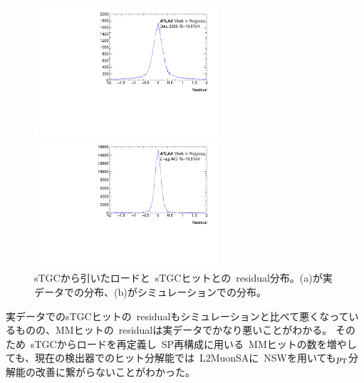 \begin{figure}[H]
        \begin{minipage}[b]{0.48\linewidth}
            \centering
            \includegraphics[clip, width=6.8cm]{fig/5/residualNewAlg_stgc.pdf}
        \end{minipage}
        \begin{minipage}[b]{0.48\linewidth}
            \centering
            \includegraphics[clip, width=6.8cm]{fig/5/residualNewAlg_stgc_MC.pdf}
        \end{minipage}
    \caption{sTGCから引いたロードと~sTGCヒットとの~residual分布。(a)が実データでの分布、(b)がシミュレーションでの分布。}
    \label{fig:stgcresidualDataMC}
\end{figure}

実データでのsTGCヒットの~residualもシミュレーションと比べて悪くなっているものの、MMヒットの~residualは実データでかなり悪いことがわかる。
そのため~sTGCからロードを再定義し~SP再構成に用いる~MMヒットの数を増やしても、現在の検出器でのヒット分解能では~L2MuonSAに~NSWを用いても$p_\mathrm{T}$分解能の改善に繋がらないことがわかった。